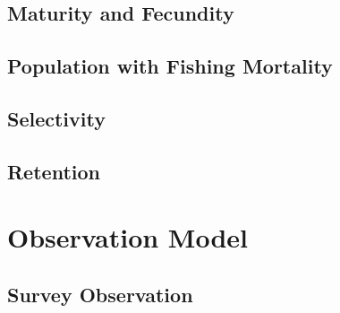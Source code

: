 \documentclass[11pt,
  english,
  letterpaper,
]{article}
\begin{document}
\leavevmode\tagmcend\tagstructend


\hypertarget{maturity-and-fecundity}{%
\subsection{Maturity and Fecundity}\label{maturity-and-fecundity}}

\leavevmode\tagmcend\tagstructend


\hypertarget{population-with-fishing-mortality}{%
\subsection{Population with Fishing Mortality}\label{population-with-fishing-mortality}}

\leavevmode\tagmcend\tagstructend


\hypertarget{selectivity}{%
\subsection{Selectivity}\label{selectivity}}

\leavevmode\tagmcend\tagstructend


\hypertarget{retention}{%
\subsection{Retention}\label{retention}}

\leavevmode\tagmcend\tagstructend


\hypertarget{observation-model}{%
\section{Observation Model}\label{observation-model}}

\leavevmode\tagmcend\tagstructend


\hypertarget{survey-observation}{%
\subsection{Survey Observation}\label{survey-observation}}
\end{document}
